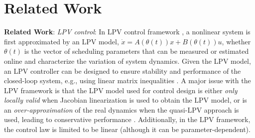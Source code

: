 \section{Related Work}
{\bf Related Work}: {\it LPV control}: In LPV control framework \cite{Shamma92gain-CSM,Rugh00gs_survey, Moh12LPVBook}, a nonlinear system is first approximated by an LPV model, $\dot x = A(\theta(t))x+ B(\theta(t))u$, whether $\theta(t)$ is the vector of scheduling parameters that can be measured or estimated online 
 and characterize the variation of system dynamics. 
 Given the LPV model, an LPV controller can be designed to ensure stability and performance of the closed-loop system, e.g., using linear matrix inequalities \cite{Wu96Induced,Apk98}. A major issue with the LPV framework is that the LPV model used for control design is either {\it only locally valid} when Jacobian linearization is used to obtain the LPV model, or is an {\it over-approximation} of the real dynamics when the quasi-LPV approach is used, leading to conservative performance \cite{Rugh00gs_survey}. 
 Additionally,  in the LPV framework, the control law is limited to be linear (although it can be parameter-dependent). 



